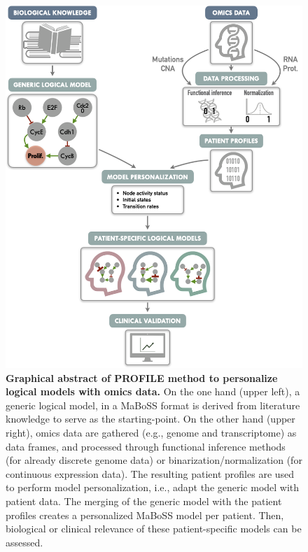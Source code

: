\documentclass[a4paper,12pt,twoside,onecolumn,openright,final,oldfontcommands]{memoir}
\begin{document}
\begin{figure}

{\centering \includegraphics[width=0.8\linewidth]{fig/PROFILE-abstract} 

}

\caption[Graphical abstract of PROFILE method to personalize logical models with omics data]{\textbf{Graphical abstract of PROFILE
method to personalize logical models with omics data.} On the one hand
(upper left), a generic logical model, in a MaBoSS format is derived
from literature knowledge to serve as the starting-point. On the other
hand (upper right), omics data are gathered (e.g., genome and
transcriptome) as data frames, and processed through functional
inference methods (for already discrete genome data) or
binarization/normalization (for continuous expression data). The
resulting patient profiles are used to perform model personalization,
i.e., adapt the generic model with patient data. The merging of the
generic model with the patient profiles creates a personalized MaBoSS
model per patient. Then, biological or clinical relevance of these
patient-specific models can be assessed.}\label{fig:PROFILE-abstract}
\end{figure}
\end{document}
